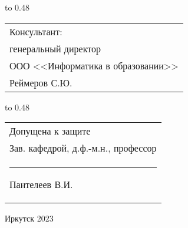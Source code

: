 {
\noindent\hbox to 0.48\textwidth {%
	\mbox{ } \hfil} %
	\begin{tabular}[t]{l}
		Консультант:\\
		генеральный директор \\
		ООО <<Информатика в образовании>>\\
		Реймеров С.Ю.		
	\end{tabular}		
}

\vspace{0.5cm}

{
	\noindent\hbox to 0.48\textwidth {%
		\mbox{ } \hfil} %
	\begin{tabular}[t]{l}
		Допущена к защите\\
		Зав. кафедрой, д.ф.-м.н., профессор \\
		\rule{2.7cm}{0.5pt} Пантелеев В.И.
	\end{tabular}		
}

\vspace{0.5cm}

\vfill 
\noindent
\begin{minipage}{\textwidth}
\centering	 Иркутск 2023
\end{minipage}